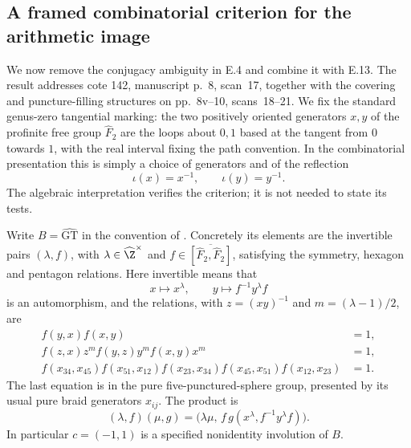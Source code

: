 \subsection{A framed combinatorial criterion for the arithmetic image}

We now remove the conjugacy ambiguity in E.4 and combine it with E.13.
The result addresses cote 142, manuscript p.~8, scan~17, together with
the covering and puncture-filling structures on pp.~8v--10, scans~18--21.
We fix the standard genus-zero tangential marking: the two positively
oriented generators $x,y$ of the profinite free group
$\widehat F_2$ are the loops about $0,1$ based at the tangent from $0$
towards $1$, with the real interval fixing the path convention. In the
combinatorial presentation this is simply a choice of generators and
of the reflection
\[
             \iota(x)=x^{-1},\qquad \iota(y)=y^{-1}.
\]
The algebraic interpretation verifies the criterion; it is not needed
to state its tests.

Write $B=\widehat{\mathrm{GT}}$ in the convention of
\citet[Definition, p.~572; Theorem~1, p.~573]{E_LochakSchneps1997}.
Concretely its elements are the invertible pairs $(\lambda,f)$, with
$\lambda\in\widehat\Z^{\times}$ and
$f\in\overline{[\widehat F_2,\widehat F_2]}$, satisfying the symmetry,
hexagon and pentagon relations. Here invertible means that
\[
       x\longmapsto x^\lambda,
       \qquad y\longmapsto f^{-1}y^\lambda f
                                                               \tag{E.14.1}
\]
is an automorphism, and the relations, with $z=(xy)^{-1}$ and
$m=(\lambda-1)/2$, are
\[
\begin{split}
 f(y,x)f(x,y)&=1,\\
 f(z,x)z^m f(y,z)y^m f(x,y)x^m&=1,\\
 f(x_{34},x_{45})f(x_{51},x_{12})f(x_{23},x_{34})
 f(x_{45},x_{51})f(x_{12},x_{23})&=1.
\end{split}                                                     \tag{E.14.2}
\]
The last equation is in the pure five-punctured-sphere group,
presented by its usual pure braid generators $x_{ij}$.
The product is
\[
 (\lambda,f)(\mu,g)=
 \bigl(\lambda\mu,\,f\,g(x^\lambda,f^{-1}y^\lambda f)\bigr).
                                                               \tag{E.14.3}
\]
In particular $c=(-1,1)$ is a specified nonidentity involution of $B$.

